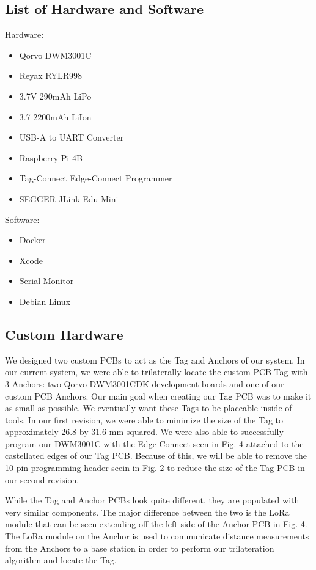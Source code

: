 \documentclass[conference]{IEEEtran}
\begin{document}
\subsection{List of Hardware and Software}
Hardware:
\begin{itemize}
    \item Qorvo DWM3001C
    \item Reyax RYLR998
    \item 3.7V 290mAh LiPo
    \item 3.7 2200mAh LiIon
    \item USB-A to UART Converter
    \item Raspberry Pi 4B
    \item Tag-Connect Edge-Connect Programmer
    \item SEGGER JLink Edu Mini
\end{itemize}

Software:
\begin{itemize}
    \item Docker
    \item Xcode
    \item Serial Monitor
    \item Debian Linux
\end{itemize}

\subsection{Custom Hardware}
We designed two custom PCBs to act as the Tag and Anchors of our system. 
In our current system, we were able to trilaterally locate the custom PCB 
Tag with 3 Anchors: two Qorvo DWM3001CDK development boards and one of our 
custom PCB Anchors. Our main goal when creating our Tag PCB was to make it 
as small as possible. We eventually want these Tags to be placeable inside 
of tools. In our first revision, we were able to minimize the size of the Tag 
to approximately 26.8 by 31.6 mm squared. We were also able to successfully 
program our DWM3001C with the Edge-Connect seen in Fig. 4 attached to the 
castellated edges of our Tag PCB. Because of this, we will be able to remove 
the 10-pin programming header seein in Fig. 2 to reduce the size of the Tag 
PCB in our second revision.

While the Tag and Anchor PCBs look quite different, they are populated with 
very similar components. The major difference between the two is the LoRa 
module that can be seen extending off the left side of the Anchor PCB in Fig. 
4. The LoRa module on the Anchor is used to communicate distance  measurements 
from the Anchors to a base station in order to perform our trilateration 
algorithm and locate the Tag.
\end{document}
